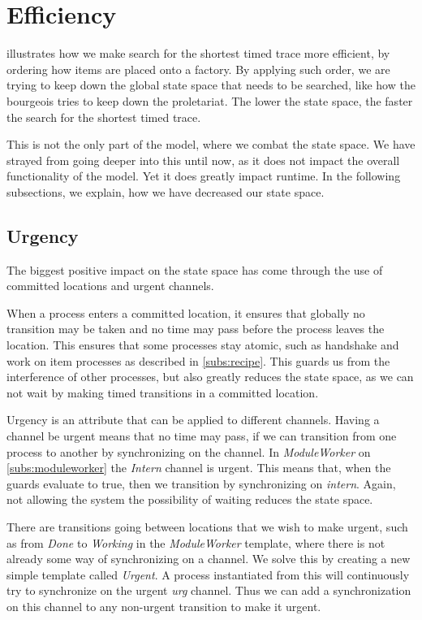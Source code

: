 \section{Efficiency}\label{subs:efficiency}
 illustrates how we make search for the shortest timed trace more efficient, by ordering how items are placed onto a factory. By applying such order, we are trying to keep down the global state space that needs to be searched, like how the bourgeois tries to keep down the proletariat. The lower the state space, the faster the search for the shortest timed trace.

This is not the only part of the model, where we combat the state space. We have strayed from going deeper into this until now, as it does not impact the overall functionality of the model. Yet it does greatly impact runtime. In the following subsections, we explain, how we have decreased our state space. 

\subsection{Urgency}
The biggest positive impact on the state space has come through the use of committed locations and urgent channels. 

When a process enters a committed location, it ensures that globally no transition may be taken and no time may pass before the process leaves the location. This ensures that some processes stay atomic, such as handshake and work on item processes as described in \cref{subs:recipe}. This guards us from the interference of other processes, but also greatly reduces the state space, as we can not wait by making timed transitions in a committed location.

Urgency is an attribute that can be applied to different channels. Having a channel be urgent means that no time may pass, if we can transition from one process to another by synchronizing on the channel. In \emph{ModuleWorker} on \cref{subs:moduleworker} the \textit{Intern} channel is urgent. This means that, when the guards evaluate to true, then we transition by synchronizing on \emph{intern}. Again, not allowing the system the possibility of waiting reduces the state space.

There are transitions going between locations that we wish to make urgent, such as from \emph{Done} to \emph{Working} in the \textit{ModuleWorker} template, where there is not already some way of synchronizing on a channel. We solve this by creating a new simple template called \emph{Urgent}. A process instantiated from this will continuously try to synchronize on the urgent \emph{urg} channel. Thus we can add a synchronization on this channel to any non-urgent transition to make it urgent. 

